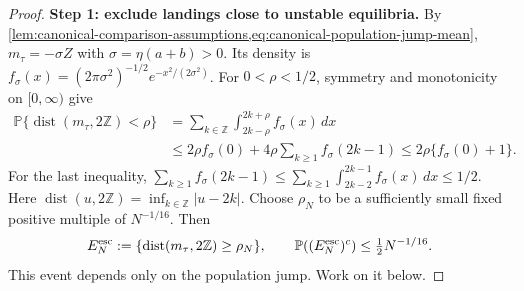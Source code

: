 \begin{proof}
\noindent\textbf{Step 1: exclude landings close to unstable equilibria.}
By \cref{lem:canonical-comparison-assumptions,eq:canonical-population-jump-mean},
$m_\tau=-\sigma Z$ with $\sigma=\eta(a+b)>0$.
Its density is $f_\sigma(x)=(2\pi\sigma^2)^{-1/2}e^{-x^2/(2\sigma^2)}$.
For $0<\rho<1/2$, symmetry and monotonicity on $[0,\infty)$ give
\[
 \begin{aligned}
 \mathbb P\{\operatorname{dist}(m_\tau,2\mathbb Z)<\rho\}
 &=\sum_{k\in\mathbb Z}\int_{2k-\rho}^{2k+\rho}f_\sigma(x)\,dx\\
 &\le2\rho f_\sigma(0)+4\rho\sum_{k\ge1}f_\sigma(2k-1)
 \le2\rho\{f_\sigma(0)+1\}.
 \end{aligned}
\]
For the last inequality,
$\sum_{k\ge1}f_\sigma(2k-1)
\le\sum_{k\ge1}\int_{2k-2}^{2k-1}f_\sigma(x)\,dx\le1/2$.
Here $\operatorname{dist}(u,2\mathbb Z)=\inf_{k\in\mathbb Z}|u-2k|$.
Choose $\rho_N$ to be a sufficiently small fixed positive multiple of
$N^{-1/16}$. Then
\begin{equation}
 E_N^{\rm esc}:=\{\operatorname{dist}(m_\tau,2\mathbb Z)\ge\rho_N\},
 \qquad \mathbb P((E_N^{\rm esc})^c)\le\tfrac12N^{-1/16}.
 \label{eq:canonical-escape-probability}
\end{equation}
This event depends only on the population jump. Work on it below.


\end{proof}
